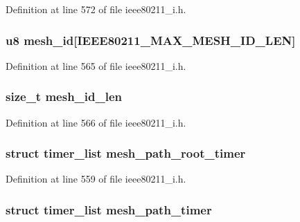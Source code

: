 Definition at line 572 of file ieee80211\-\_\-i.\-h.

\hypertarget{structieee80211__if__mesh_a2711e1d2c70fa6d2655834f90803d57b}{
\subsubsection[{mesh\-\_\-id}]{\setlength{\rightskip}{0pt plus 5cm}u8 mesh\-\_\-id\mbox{[}I\-E\-E\-E80211\-\_\-\-M\-A\-X\-\_\-\-M\-E\-S\-H\-\_\-\-I\-D\-\_\-\-L\-E\-N\mbox{]}}}\label{structieee80211__if__mesh_a2711e1d2c70fa6d2655834f90803d57b}


Definition at line 565 of file ieee80211\-\_\-i.\-h.

\hypertarget{structieee80211__if__mesh_a791aab7f12f13e6fa1f99f0eaf4fd7b0}{
\subsubsection[{mesh\-\_\-id\-\_\-len}]{\setlength{\rightskip}{0pt plus 5cm}size\-\_\-t mesh\-\_\-id\-\_\-len}}\label{structieee80211__if__mesh_a791aab7f12f13e6fa1f99f0eaf4fd7b0}


Definition at line 566 of file ieee80211\-\_\-i.\-h.

\hypertarget{structieee80211__if__mesh_a06ffe037b1a26965a1463ba7bf70e516}{
\subsubsection[{mesh\-\_\-path\-\_\-root\-\_\-timer}]{\setlength{\rightskip}{0pt plus 5cm}struct timer\-\_\-list mesh\-\_\-path\-\_\-root\-\_\-timer}}\label{structieee80211__if__mesh_a06ffe037b1a26965a1463ba7bf70e516}


Definition at line 559 of file ieee80211\-\_\-i.\-h.

\hypertarget{structieee80211__if__mesh_ac6aa531e38336119608446120beb1794}{
\subsubsection[{mesh\-\_\-path\-\_\-timer}]{\setlength{\rightskip}{0pt plus 5cm}struct timer\-\_\-list mesh\-\_\-path\-\_\-timer}}\label{structieee80211__if__mesh_ac6aa531e38336119608446120beb1794}


